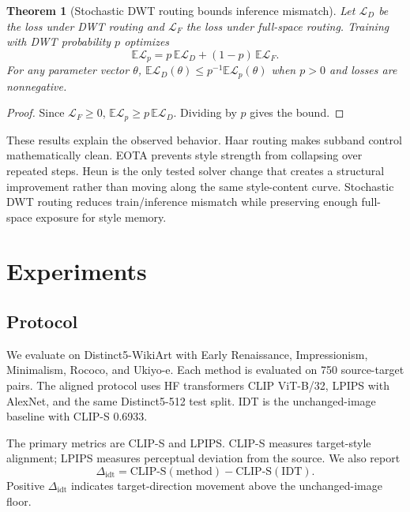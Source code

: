 \documentclass[letterpaper]{article}
\newtheorem{theorem}{Theorem}
\begin{document}
\begin{theorem}[Stochastic DWT routing bounds inference mismatch]
Let $\mathcal{L}_{D}$ be the loss under DWT routing and $\mathcal{L}_{F}$ the loss under full-space routing. Training with DWT probability $p$ optimizes
\begin{equation}
    \mathbb{E}\mathcal{L}_{p}
    =p\,\mathbb{E}\mathcal{L}_{D}+(1-p)\,\mathbb{E}\mathcal{L}_{F}.
\end{equation}
For any parameter vector $\theta$, $\mathbb{E}\mathcal{L}_{D}(\theta)\le p^{-1}\mathbb{E}\mathcal{L}_{p}(\theta)$ when $p>0$ and losses are nonnegative.
\end{theorem}
\begin{proof}
Since $\mathcal{L}_{F}\ge 0$, $\mathbb{E}\mathcal{L}_{p}\ge p\,\mathbb{E}\mathcal{L}_{D}$. Dividing by $p$ gives the bound.
\end{proof}

These results explain the observed behavior. Haar routing makes subband control mathematically clean. EOTA prevents style strength from collapsing over repeated steps. Heun is the only tested solver change that creates a structural improvement rather than moving along the same style-content curve. Stochastic DWT routing reduces train/inference mismatch while preserving enough full-space exposure for style memory.

\section{Experiments}
\subsection{Protocol}
We evaluate on Distinct5-WikiArt with Early Renaissance, Impressionism, Minimalism, Rococo, and Ukiyo-e. Each method is evaluated on 750 source-target pairs. The aligned protocol uses HF transformers CLIP ViT-B/32, LPIPS with AlexNet, and the same Distinct5-512 test split. IDT is the unchanged-image baseline with CLIP-S 0.6933.

The primary metrics are CLIP-S and LPIPS. CLIP-S measures target-style alignment; LPIPS measures perceptual deviation from the source. We also report
\begin{equation}
    \Delta_{\mathrm{idt}}=\mathrm{CLIP\mbox{-}S}(\mathrm{method})-\mathrm{CLIP\mbox{-}S}(\mathrm{IDT}).
\end{equation}
Positive $\Delta_{\mathrm{idt}}$ indicates target-direction movement above the unchanged-image floor.
\end{document}

